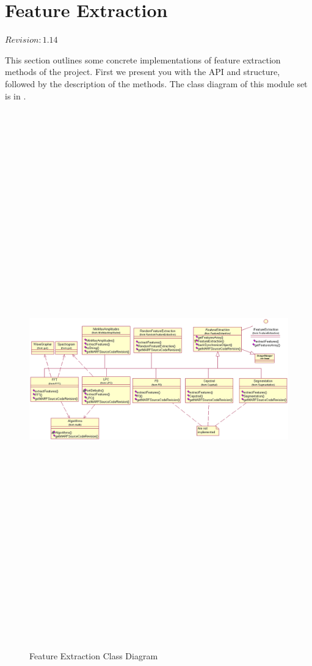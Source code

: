 \section{Feature Extraction}

$Revision: 1.14 $

This section outlines some concrete implementations of feature extraction methods of the {\marf} project.
First we present you with the API and structure, followed
by the description of the methods. The class diagram of this
module set is in .

\begin{figure}
	\centering
	\includegraphics[angle=90,height=660pt]{../graphics/arch/feature-extraction.png}
	\caption{Feature Extraction Class Diagram}
	\label{fig:feat}
\end{figure}















